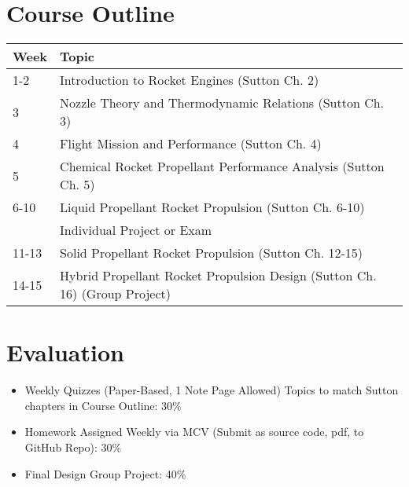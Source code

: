 \documentclass[12pt]{article}
\begin{document}
\section*{Course Outline}
\begin{tabular}{|l|p{14cm}|}
\hline
\textbf{Week} & \textbf{Topic} \\
\hline
1-2 & Introduction to Rocket Engines (Sutton Ch. 2) \\
3 & Nozzle Theory and Thermodynamic Relations (Sutton Ch. 3) \\
4 & Flight Mission and Performance (Sutton Ch. 4) \\
5 & Chemical Rocket Propellant Performance Analysis (Sutton Ch. 5) \\
6-10 & Liquid Propellant Rocket Propulsion (Sutton Ch. 6-10) \\
    & Individual Project or Exam \\
11-13 & Solid Propellant Rocket Propulsion (Sutton Ch. 12-15) \\
14-15 & Hybrid Propellant Rocket Propulsion Design (Sutton Ch. 16) (Group Project) \\
\hline
\end{tabular}

\section*{Evaluation}
\begin{itemize}
    \item Weekly Quizzes (Paper-Based, 1 Note Page Allowed) Topics to match Sutton chapters in Course Outline: 30\%
    \item Homework Assigned Weekly via MCV (Submit as source code, pdf, to GitHub Repo): 30\%
    \item Final Design Group Project: 40\%
\end{itemize}
\end{document}
